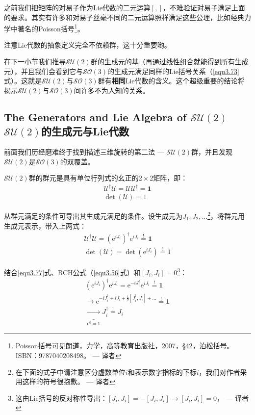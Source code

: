 之前我们把矩阵的对易子作为Lie代数的二元运算$[,]$，不难验证对易子满足上面的要求。其实有许多和对易子丝毫不同的二元运算照样满足这些公理，比如经典力学中著名的Poisson括号\footnote{Poisson括号可见朗道，力学，高等教育出版社，2007，\S42，泊松括号。ISBN：9787040208498。 --- 译者}。

注意Lie代数的抽象定义完全不依赖群，这十分重要哟。

在下一小节我们推导$\mathcal{SU}(2)$群的生成元的基（再通过线性组合就能得到所有生成元），并且我们会看到它与$\mathcal{SO}(3)$的生成元满足同样的Lie括号关系（\ref{equ3.73}式）。这就是$\mathcal{SU}(2)$与$\mathcal{SO}(3)$群有{\bf 相同}Lie代数的含义。这个超级重要的结论将揭示$\mathcal{SU}(2)$与$\mathcal{SO}(3)$间许多不为人知的关系。



\subsection[$\mathcal{SU}(2)$的生成元与Lie代数]{The Generators and Lie Algebra of $\mathcal{SU}(2)$ \quad $\mathcal{SU}(2)$的生成元与Lie代数}
\label{sec3.4.3}
前面我们历经磨难终于找到描述三维旋转的第二法 --- $\mathcal{SU}(2)$群，并且发现$\mathcal{SU}(2)$是$\mathcal{SO}(3)$的双覆盖。

$\mathcal{SU}(2)$群的群元是具有单位行列式的幺正的$2 \times 2$矩阵，即：
\begin{align}
\label{equ3.75}
\mathcal{U}^\dag \mathcal{U} = \mathcal{U} \mathcal{U}^\dag = \mathbf{1} \\
\label{equ3.76}
\det (\mathcal{U}) = 1
\end{align}

从群元满足的条件可导出其生成元满足的条件。设生成元为$J_1, J_2, \dots$\footnote{在下面的式子中请注意区分虚数单位$i$和表示数字指标的下标$i$，我们对作者采用这样的符号很抱歉。 --- 译者}，将群元用生成元表示，带入上两式：
\begin{align}
\label{equ3.77}
\mathcal{U}^\dag \mathcal{U} = (\mathrm{e}^{iJ_i})^\dag \mathrm{e}^{iJ_i} \stackrel{!}{=} \mathbf{1} \\
\label{equ3.78}
\det (\mathcal{U}) = \det (\mathrm{e}^{iJ_i}) \stackrel{!}{=} 1
\end{align}

结合\ref{equ3.77}式、BCH公式（\ref{equ3.56}式）和$[J_i, J_i] = 0$\footnote{这由Lie括号的反对称性导出：$[J_i, J_i] = -[J_i, J_i] \rightarrow [J_i, J_i] = 0$， --- 译者}：
\begin{align}
(\mathrm{e}^{i J_i})^\dag \mathrm{e}^{i J_i} = \mathrm{e}^{-i J_i^\dag} \mathrm{e}^{i J_i} \stackrel{!}{=} \mathbf{1} \nonumber \\
\rightarrow \mathrm{e}^{-i J_i^\dag + i J_i + \frac{1}{2}[J_i^\dag, J_i] + \dots } \stackrel{!}{=} \mathbf{1} \nonumber \\
\label{equ3.79}
\underbrace{\rightarrow}_{\mathrm{e}^0 = 1} J_i^\dag \stackrel{!}{=} J_i
\end{align}

